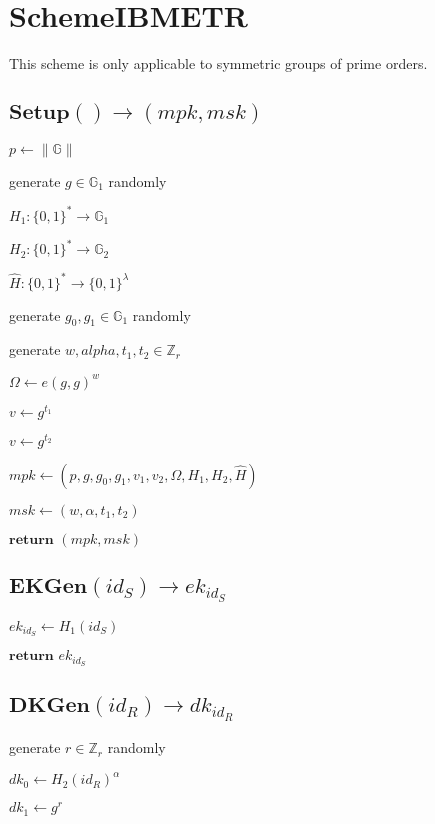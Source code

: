 \documentclass[a4paper]{article}
\begin{document}
\section{SchemeIBMETR}

This scheme is only applicable to symmetric groups of prime orders. 

\subsection{$\textbf{Setup}() \rightarrow (\textit{mpk}, \textit{msk})$}

$p \gets \|\mathbb{G}\|$

generate $g \in \mathbb{G}_1$ randomly

$H_1:\{0, 1\}^* \rightarrow \mathbb{G}_1$

$H_2:\{0, 1\}^* \rightarrow \mathbb{G}_2$

$\hat{H}: \{0, 1\}^* \rightarrow \{0, 1\}^\lambda$

generate $g_0, g_1 \in \mathbb{G}_1$ randomly

generate $w, alpha, t_1, t_2 \in \mathbb{Z}_r$

$\Omega \gets e(g, g)^w$

$v \gets g^{t_1}$

$v \gets g^{t_2}$

$\textit{mpk} \gets (p, g, g_0, g_1, v_1, v_2, \Omega, H_1, H_2, \hat{H})$

$\textit{msk} \gets (w, \alpha, t_1, t_2)$

$\textbf{return }(\textit{mpk}, \textit{msk})$

\subsection{$\textbf{EKGen}(\textit{id}_S) \rightarrow \textit{ek}_{\textit{id}_S}$}

$\textit{ek}_{\textit{id}_S} \gets H_1(\textit{id}_S)$

$\textbf{return }\textit{ek}_{\textit{id}_S}$

\subsection{$\textbf{DKGen}(\textit{id}_R) \rightarrow \textit{dk}_{\textit{id}_R}$}

generate $r \in \mathbb{Z}_r$ randomly

$\textit{dk}_0 \gets H_2(\textit{id}_R)^\alpha$

$\textit{dk}_1 \gets g^r$
\end{document}
